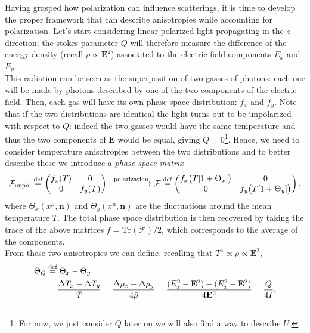 Having grasped how polarization can influence scatterings, it is time to develop the proper framework that can describe anisotropies while accounting for polarization. Let's start considering linear polarized light propagating in the $z$ direction: the stokes parameter $Q$ will therefore measure the difference of the energy density (recall $\rho\propto \mathbf{E}^2$) associated to the electric field components $E_x$ and $E_y$.\\ This radiation can be seen as the superposition of two gasses of photons: each one will be made by photons described by one of the two components of the electric field. Then, each gas will have its own phase space distribution: $f_x$ and $f_y$. Note that if the two distributions are identical the light turns out to be unpolarized with respect to $Q$: indeed the two gasses would have the same temperature and thus the two components of $\mathbf{E}$ would be equal, giving $Q=0$\footnote{For now, we just consider $Q$ later on we will also find a way to describe $U$.}. Hence, we need to consider temperature anisotropies between the two distributions and to better describe these we introduce a \emph{phase space matrix}
\begin{equation}
    \label{eq:Pol_Occup_Matrix}
    \mathcal{F} _\text{unpol} \stackrel{\text{def}}{=}
    \begin{pmatrix}
        f_x(\bar T) & 0 \\ 0 & f_y(\bar T)
    \end{pmatrix}\ \xrightarrow{\text{polarization}}\mathcal{F}  \stackrel{\text{def}}{=}
    \begin{pmatrix}
        f_x\big(\bar T[1+\Theta_x]\big) & 0 \\ 0 & f_y\big(\bar T[1+\Theta_y ]\big)
    \end{pmatrix},
\end{equation}
where $\Theta_x(x^\mu,\mathbf n)$ and $\Theta_y(x^\mu,\mathbf n)$ are the fluctuations around the mean temperature $\bar T$. The total phase space distribution is then recovered by taking the trace of the above matrices $f=\text{Tr}(\mathcal{F} )/2$, which corresponds to the average of the components.\\
From these two anisotropies we can define, recalling that $T^4\propto\rho\propto\mathbf{E}^2$,
\begin{align}
    \label{eq:ThetaQ}
    \Theta_Q&\stackrel{\text{def}}{=}\Theta_x-\Theta_y\\&=\frac{\Delta T_x-\Delta T_y}{\bar T}=\frac{\Delta\rho_x-\Delta\rho_y}{4\bar\rho}=\frac{(E_x^2-\mathbf{E}^2)-(E_x^2-\mathbf{E}^2)}{4\mathbf{E}^2}=\frac{Q}{4I},\nonumber
\end{align}

